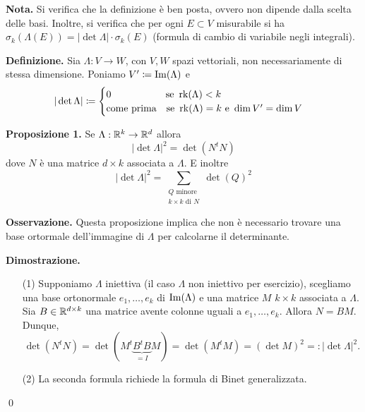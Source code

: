 \textbf{Nota.} Si verifica che la definizione è ben posta, ovvero non dipende dalla scelta delle basi. Inoltre, si verifica che per ogni $E \subset V$ misurabile si ha $\sigma_k(\Lambda(E)) = |\det \Lambda| \cdot \sigma_k(E)$ (formula di cambio di variabile negli integrali).

\textbf{Definizione.} Sia $\Lambda \colon V \to W$, con $V,W$ spazi vettoriali, non necessariamente di stessa dimensione. Poniamo $V' \coloneqq \operatorname{Im}(\Lambda)$ e 
%
$$
|\det \Lambda| \coloneqq 
\begin{cases}
	0 \qquad \qquad \quad \;\; \text{se } \operatorname{rk} (\Lambda) < k \\
	\text{come prima} \quad \text{se } \operatorname{rk}(\Lambda) = k \text{ e } \operatorname{dim} V' = \operatorname{dim} V
\end{cases} 
$$

\textbf{Proposizione 1.} Se $\Lambda : \mathbb R^k \to \mathbb R^d$ allora
%
\begin{equation}
	\tag{1}
	|\det \Lambda |^2 = \det (N^t N)
\end{equation}
%
dove $N$ è una matrice $d \times k$ associata a $\Lambda$.
E inoltre
%
\begin{equation}
	\tag{2}
	|\det \Lambda |^2 = \sum_{\substack{Q \text{ minore} \\ k \times k \text { di } N}} \det(Q)^2
\end{equation}
%

\textbf{Osservazione.} Questa proposizione implica che non è necessario trovare una base ortormale dell'immagine di $\Lambda$ per calcolarne il determinante.

\textbf{Dimostrazione.} 
\begin{itemize}

	\item[(1)] Supponiamo $\Lambda$ iniettiva (il caso $\Lambda$ non iniettivo per esercizio), scegliamo una base ortonormale $e_1,\ldots,e_k$ di $\operatorname{Im}(\Lambda)$ e una matrice $M$ $k \times k$ associata a $\Lambda$.
	Sia $B \in \mathbb R^{d \times k}$ una matrice avente colonne uguali a $e_1,\ldots,e_k$. Allora $N = BM$.
	Dunque, 
	$$
		\det(N^t N) = \det(M^t \underbrace{B^t B}_{= I} M) = \det (M^t M) = (\det M)^2 =: |\det \Lambda|^2.
	$$
	

	\item[(2)] La seconda formula richiede la formula di Binet generalizzata.

\end{itemize}
\qed
